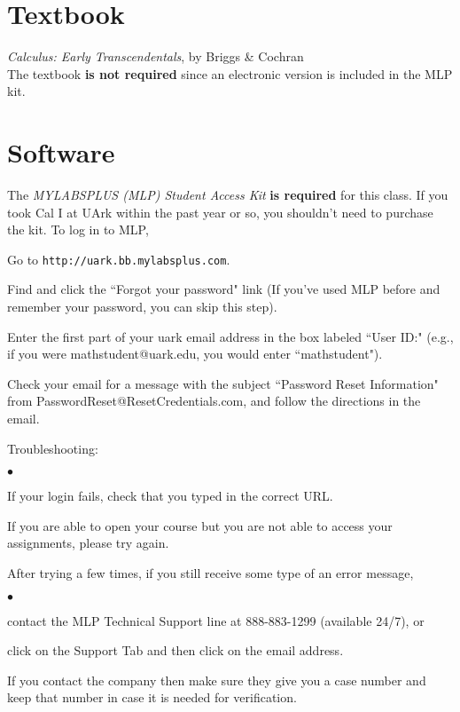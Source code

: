 \documentclass[margin,line,pifont,palatino,courier]{res}
\newenvironment{list1}{
  \begin{list}{\ding{113}}{%
      \setlength{\itemsep}{0in}
      \setlength{\parsep}{0in} \setlength{\parskip}{0in}
      \setlength{\topsep}{0in} \setlength{\partopsep}{0in}
      \setlength{\leftmargin}{0.17in}}}{\end{list}}
\newenvironment{list2}{
  \begin{list}{$\bullet$}{%
      \setlength{\itemsep}{0in}
      \setlength{\parsep}{0in} \setlength{\parskip}{0in}
      \setlength{\topsep}{0in} \setlength{\partopsep}{0in}
      \setlength{\leftmargin}{0.2in}}}{\end{list}}
\begin{document}
\begin{resume}
\section{\sc Textbook} \emph{Calculus: Early Transcendentals}, by Briggs \& Cochran \\
The textbook {\bf is not required} since an electronic version is included in the MLP kit.  

\section{\sc Software} The \emph{MYLABSPLUS (MLP) Student Access Kit} {\bf is required} for this class. If you took Cal I at UArk within the past year or so, you shouldn't need to purchase the kit. To log in to MLP, 
\begin{list1} 
\item Go to \verb+http://uark.bb.mylabsplus.com+. 
\item Find and click the ``Forgot your password" link (If you've used MLP before and remember your password, you can skip this step).
\item Enter the first part of your uark email address in the box labeled ``User ID:" (e.g., if you were mathstudent@uark.edu, you would enter ``mathstudent").  
\item Check your email for a message with the subject ``Password Reset Information" from PasswordReset@ResetCredentials.com, and follow the directions in the email.
\item Troubleshooting: 
	\begin{list2}
	\item If your login fails, check that you typed in the correct URL. 
	\item If you are able to open your course but you are not able to access your assignments, please try again.  
	\item After trying a few times, if you still receive some type of an error message,
		\begin{list2}
		\item contact the MLP Technical Support line at 888-883-1299 (available 24/7), or 
		\item click on the Support Tab and then click on the email address. 
		\end{list2}
	\item If you contact the company then make sure they give you a case number and keep that number in case it is needed for verification. 

\end{list2}
\end{list1}
\end{resume}
\end{document}
